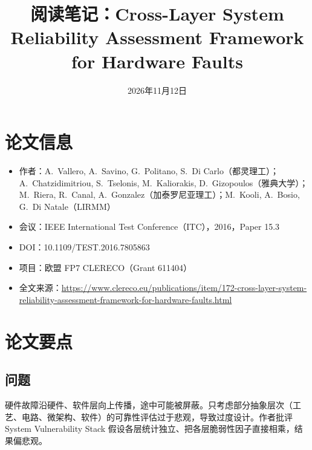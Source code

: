 \documentclass[11pt,a4paper]{ctexart}
\title{阅读笔记：Cross-Layer System Reliability Assessment Framework for Hardware Faults}
\date{2026年11月12日}
\begin{document}
\maketitle

\section*{论文信息}
\begin{itemize}[leftmargin=*]
  \item 作者：A.~Vallero, A.~Savino, G.~Politano, S.~Di Carlo（都灵理工）；A.~Chatzidimitriou, S.~Tselonis, M.~Kaliorakis, D.~Gizopoulos（雅典大学）；M.~Riera, R.~Canal, A.~Gonzalez（加泰罗尼亚理工）；M.~Kooli, A.~Bosio, G.~Di Natale（LIRMM）
  \item 会议：IEEE International Test Conference（ITC），2016，Paper 15.3
  \item DOI：10.1109/TEST.2016.7805863
  \item 项目：欧盟 FP7 CLERECO（Grant 611404）
  \item 全文来源：\url{https://www.clereco.eu/publications/item/172-cross-layer-system-reliability-assessment-framework-for-hardware-faults.html}
\end{itemize}

\section{论文要点}

\subsection{问题}
硬件故障沿硬件、软件层向上传播，途中可能被屏蔽。只考虑部分抽象层次（工艺、电路、微架构、软件）的可靠性评估过于悲观，导致过度设计。作者批评 System Vulnerability Stack 假设各层统计独立、把各层脆弱性因子直接相乘，结果偏悲观。
\end{document}
